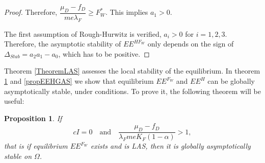 \documentclass{article}
\newcommand{\lfw}{\lambda_{F}}
\newcommand{\lfw}{\lambda_{F}}
\newtheorem{prop}{Proposition}
\begin{document}
\begin{proof}
Therefore, $\dfrac{\mu_D - f_D}{m e\lfw} \geq F^*_{W}$. This implies $a_1 > 0$.

The first assumption of Rough-Hurwitz is verified, $a_i > 0$ for $i=1,2,3$. Therefore, the asymptotic stability of $EE^{HF_W}$ only depends on the sign of $\Delta_{Stab}= a_2 a_1 - a_0$, which has to be positive.
\end{proof}

Theorem \ref{TheoremLAS} assesses the local stability of the equilibrium. In theorem \ref{propEEFGAS} and \ref{propEEHGAS} we show that equilibrium $EE^{F_W}$ and $EE^{H}$ can be globally asymptotically stable, under conditions. To prove it, the following theorem will be useful:


\begin{prop}\label{propEEFGAS}If 
$$
cI = 0 
\quad \text{and} \quad
\dfrac{\mu_D - f_D}{\lfw m e K_F(1-\alpha)} >1,
$$
that is if equilibrium $EE^{F_W}$ exists and is LAS, then it is globally asymptotically stable on $\Omega$.
\end{prop}
\end{document}
